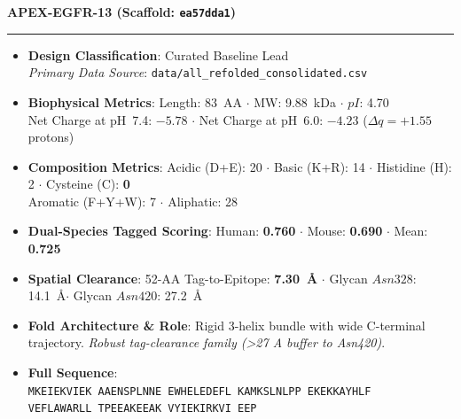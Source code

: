 \documentclass[11pt]{article}
\begin{document}
\noindent\textbf{\color{navyblue}\large APEX-EGFR-13  \quad (Scaffold: \texttt{ea57dda1})} \\
\vspace{-0.4em}
\rule{\textwidth}{0.6pt}
\vspace{-0.2em}
\begin{itemize}
  \setlength{\itemsep}{2pt}
  \setlength{\parskip}{0pt}
  \item \textbf{Design Classification}: Curated Baseline Lead \\
    \textit{Primary Data Source}: \texttt{\small data/all\_refolded\_consolidated.csv}
  \item \textbf{Biophysical Metrics}: Length: 83~AA $\cdot$ MW: 9.88~kDa $\cdot$ $pI$: 4.70 \\
    Net Charge at pH~7.4: $-5.78$ $\cdot$ Net Charge at pH~6.0: $-4.23$ ($\Delta q = +1.55$ protons)
  \item \textbf{Composition Metrics}: Acidic (D+E): 20 $\cdot$ Basic (K+R): 14 $\cdot$ Histidine (H): 2 $\cdot$ Cysteine (C): \textbf{0} \\
    Aromatic (F+Y+W): 7 $\cdot$ Aliphatic: 28
  \item \textbf{Dual-Species Tagged Scoring}: Human: \textbf{0.760} $\cdot$ Mouse: \textbf{0.690} $\cdot$ Mean: \textbf{0.725}
  \item \textbf{Spatial Clearance}: 52-AA Tag-to-Epitope: \textbf{7.30~\AA} $\cdot$ Glycan $Asn328$: 14.1~\AA $\cdot$ Glycan $Asn420$: 27.2~\AA
  \item \textbf{Fold Architecture \& Role}: Rigid 3-helix bundle with wide C-terminal trajectory. \textit{Robust tag-clearance family (>27 A buffer to Asn420)}.
  \item \textbf{Full Sequence}: \\
    \texttt{\small MKEIEKVIEK AAENSPLNNE EWHELEDEFL KAMKSLNLPP EKEKKAYHLF \\
    VEFLAWARLL TPEEAKEEAK VYIEKIRKVI EEP}
\end{itemize}
\vspace{0.8em}
\end{document}
